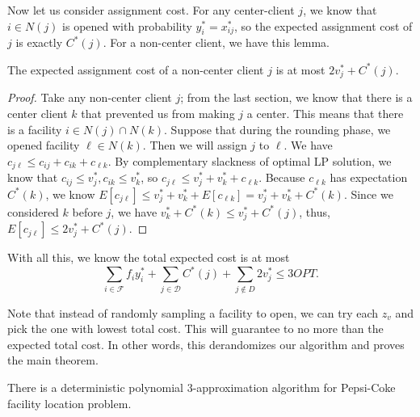 Now let us consider assignment cost. For any center-client $j$,
we know that $i \in N(j)$ is opened with probability $y^*_i = x^*_{ij}$,
so the expected assignment cost of $j$ is exactly $C^*(j)$. For a non-center client, we have this lemma.

\begin{lem}
The expected assignment cost of a non-center client $j$ is at most
$2 v^*_j + C^*(j)$.
\end{lem}
\begin{proof}
Take any non-center client $j$; from the last section, we know that there is a center client $k$
that prevented us from making $j$ a center. This means that there is a facility $i \in N(j) \cap N(k)$.
Suppose that during the rounding phase, we opened facility $\ell \in N(k)$. Then we will assign $j$ to
$\ell$. 
We have $c_{j\ell} \le c_{ij} + c_{ik} + c_{\ell k}$.
By complementary slackness of optimal LP solution, we know that $c_{ij} \le v^*_j, c_{ik}\le v^*_k$, so
$c_{j\ell } \le v^*_j + v^*_k + c_{\ell k}$.
Because $c_{\ell k}$ has expectation $C^*(k)$, we know
$E [c_{j\ell }] \le v^*_j + v^*_k + E [c_{\ell k}] = v^*_j + v^*_k + C^*(k)$.
Since we considered $k$ before $j$, we have $v^*_k + C^*(k) \le v^*_j + C^*(j)$, thus,
$E [c_{j\ell}] \le 2v^*_j + C^*(j)$.
\end{proof}

With all this, we know the total expected cost is at most
\[  \sum_{i \in \mathcal{F}} f_i y^*_i + \sum_{j \in \mathcal{D}} C^*(j) + \sum_{j \not \in D} 2v^*_j
\le 3 OPT .   \]

Note that instead of randomly sampling a facility to open, we can try each $z_v$ and pick the one
with lowest total cost. This will guarantee to no more than the expected total cost.
In other words, this derandomizes our algorithm and proves the main theorem.

\begin{thm}
There is a deterministic polynomial 3-approximation algorithm for Pepsi-Coke facility location problem.
\end{thm}
